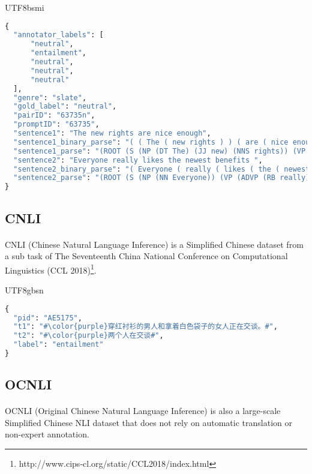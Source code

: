 \documentclass{article}
\begin{document}
\begin{CJK*}{UTF8}{bsmi}
\begin{minipage}{\linewidth}
\begin{lstlisting}[language=Python, caption=Example of MNLI]
{
  "annotator_labels": [
      "neutral",
      "entailment",
      "neutral",
      "neutral",
      "neutral"
  ],
  "genre": "slate",
  "gold_label": "neutral",
  "pairID": "63735n",
  "promptID": "63735",
  "sentence1": "The new rights are nice enough",
  "sentence1_binary_parse": "( ( The ( new rights ) ) ( are ( nice enough ) ) )",
  "sentence1_parse": "(ROOT (S (NP (DT The) (JJ new) (NNS rights)) (VP (VBP are) (ADJP (JJ nice) (RB enough)))))",
  "sentence2": "Everyone really likes the newest benefits ",
  "sentence2_binary_parse": "( Everyone ( really ( likes ( the ( newest benefits ) ) ) ) )",
  "sentence2_parse": "(ROOT (S (NP (NN Everyone)) (VP (ADVP (RB really)) (VBZ likes) (NP (DT the) (JJS newest) (NNS benefits)))))"
}
\end{lstlisting}
\end{minipage}

\subsection{CNLI}
\paragraph{}
CNLI (Chinese Natural Language Inference) is a Simplified Chinese dataset from a sub task of The Seventeenth China National Conference on Computational Linguistics (CCL 2018)\footnote{\label{foo}http://www.cips-cl.org/static/CCL2018/index.html}.

\begin{CJK*}{UTF8}{gbsn}
\begin{lstlisting}[language=Python, escapechar=\#, caption=Example of CNLI]
{
  "pid": "AE5175",
  "t1": "#\color{purple}穿红衬衫的男人和拿着白色袋子的女人正在交谈。#",
  "t2": "#\color{purple}两个人在交谈#",
  "label": "entailment"
}
\end{lstlisting}
\end{CJK*}

\subsection{OCNLI}
\paragraph{}
OCNLI (Original Chinese Natural Language Inference) is also a large-scale Simplified Chinese NLI dataset that does not rely on automatic translation or non-expert annotation.


\end{CJK*}
\end{document}
